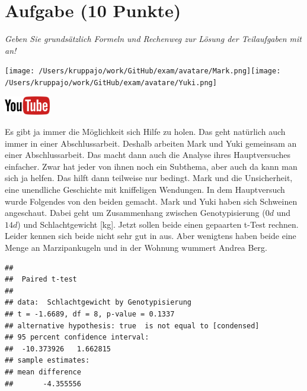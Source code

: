 \documentclass[a4paper, 9pt]{scrartcl}\usepackage[]{graphicx}\usepackage[]{xcolor}
\makeatletter
\newenvironment{kframe}{%
 \def\at@end@of@kframe{}%
 \ifinner\ifhmode%
  \def\at@end@of@kframe{\end{minipage}}%
  \begin{minipage}{\columnwidth}%
 \fi\fi%
 \def\FrameCommand##1{\hskip\@totalleftmargin \hskip-\fboxsep
 \colorbox{shadecolor}{##1}\hskip-\fboxsep
     \hskip-\linewidth \hskip-\@totalleftmargin \hskip\columnwidth}%
 \MakeFramed {\advance\hsize-\width
   \@totalleftmargin\z@ \linewidth\hsize
   \@setminipage}}%
 {\par\unskip\endMakeFramed%
 \at@end@of@kframe}
\newenvironment{knitrout}{}{} %
\makeatother
\begin{document}
\clearpage

\section{Aufgabe \hfill (10 Punkte)}

\textit{Geben Sie grundsätzlich Formeln und Rechenweg zur Lösung der Teilaufgaben mit an!} \\[1Ex]
 

 
\begin{minipage}[t]{0.5\textwidth}
\texttt{[image: /Users/kruppajo/work/GitHub/exam/avatare/Mark.png]}\hspace{-4mm}\texttt{[image: /Users/kruppajo/work/GitHub/exam/avatare/Yuki.png]}
\end{minipage}
\begin{minipage}[t]{0.5\textwidth}
\hfill
\href{https://youtu.be/kHmfEmU6lrk}{\includegraphics[width = 2cm]{img/youtube}}
\end{minipage}
\vspace{1ex}



Es gibt ja immer die Möglichkeit sich Hilfe zu holen. Das geht natürlich auch immer in einer Abschlussarbeit. Deshalb arbeiten Mark und Yuki gemeinsam an einer Abschlussarbeit. Das macht dann auch die Analyse ihres Hauptversuches einfacher. Zwar hat jeder von ihnen noch ein Subthema, aber auch da kann man sich ja helfen. Das hilft dann teilweise nur bedingt. Mark und die Unsicherheit, eine unendliche Geschichte mit kniffeligen Wendungen. In dem Hauptversuch wurde Folgendes von den beiden gemacht. Mark und Yuki haben sich Schweinen angeschaut. Dabei geht um Zusammenhang zwischen Genotypisierung ($0d$ und $14d$) und Schlachtgewicht [kg]. Jetzt sollen beide einen gepaarten t-Test rechnen. Leider kennen sich beide nicht sehr gut in \Rlogo aus. Aber wenigtens haben beide eine Menge an Marzipankugeln und in der Wohnung wummert Andrea Berg.

\begin{knitrout}
\color{fgcolor}\begin{kframe}
\begin{verbatim}
## 
## 	Paired t-test
## 
## data:  Schlachtgewicht by Genotypisierung
## t = -1.6689, df = 8, p-value = 0.1337
## alternative hypothesis: true  is not equal to [condensed]
## 95 percent confidence interval:
##  -10.373926   1.662815
## sample estimates:
## mean difference 
##       -4.355556
\end{verbatim}
\end{kframe}
\end{knitrout}
\end{document}
